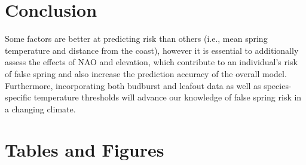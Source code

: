 \documentclass{article}\usepackage[]{graphicx}\usepackage[]{color}
\begin{document}
\section*{Conclusion}
 Some factors are better at predicting risk than others (i.e., mean spring temperature and distance from the coast), however it is essential to additionally assess the effects of NAO and elevation, which contribute to an individual's risk of false spring and also increase the prediction accuracy of the overall model.  %
Furthermore, incorporating both budburst and leafout data as well as species-specific temperature thresholds will advance our knowledge of false spring risk in a changing climate. 
\fi




\section*{Tables and Figures} 
\end{document}
